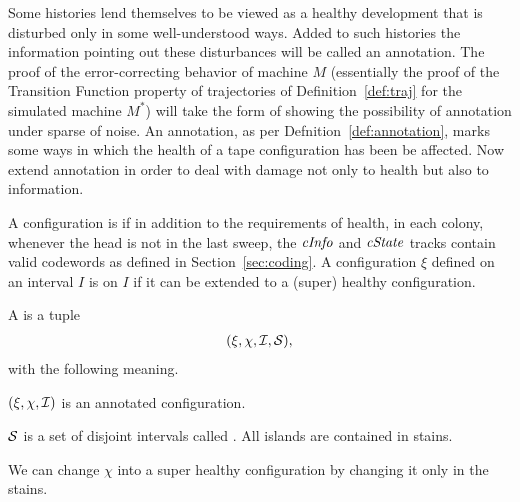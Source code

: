 \documentclass[12pt]{memoir}
\newcommand{\fld}[1]{\ensuremath{\textit{#1\/}}}
\newcommand{\cInfo}{\fld{cInfo}}
\newcommand{\cState}{\fld{cState}}
\begin{document}
Some histories lend themselves to be viewed as a healthy development
that is disturbed only in some well-understood ways.
Added to such histories the information pointing out these disturbances will be called an annotation.
The proof of the error-correcting behavior of machine \( M \) (essentially the proof of the Transition Function
property of trajectories of Definition~\ref{def:traj} for the simulated machine \( M^{*} \))
will take the form of showing the possibility of annotation under sparse of noise.
An annotation, as per Defnition~\ref{def:annotation}, marks some ways in which the health 
of a tape configuration has been be affected.
Now extend annotation in order to deal with damage not only to health but also to information.

 \begin{definition}\label{def:super-healthy} 
A configuration is
 if in addition to the requirements of health, in each colony,
whenever the head is not in the last sweep, the \( \cInfo \) and \( \cState \)
tracks contain valid codewords as defined in Section~\ref{sec:coding}.
A configuration \( \xi \) defined on an interval \( I \) is 
on \( I \) if it can be extended to a (super) healthy configuration.
\end{definition}


\begin{definition}\label{def:super-annotation}
  A  is a tuple
  \begin{align*}
    (\xi,\chi, \mathcal{I}, \mathcal{S}),
  \end{align*}
  with the following meaning.

\( (\xi,\chi,\mathcal{I}) \) is an annotated configuration.

\( \mathcal{S} \) is a set of disjoint intervals called .
All islands are contained in stains.

We can change \( \chi \) into a super healthy configuration by changing it only in the stains.
  \end{definition}
\end{document}
